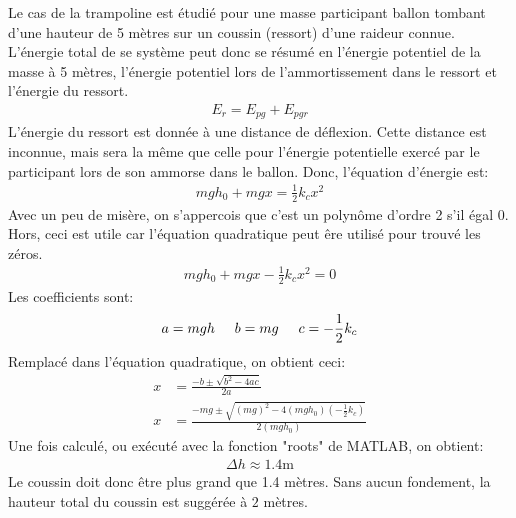 Le cas de la trampoline est étudié pour une masse participant ballon tombant
d'une hauteur de 5 mètres sur un coussin (ressort) d'une raideur connue.
L'énergie total de se système peut donc se résumé en l'énergie potentiel de la
masse à 5 mètres, l'énergie potentiel lors de l'ammortissement dans le ressort
et l'énergie du ressort.
\begin{align}
E_r=E_{pg}+E_{pgr}
\end{align}
L'énergie du ressort est donnée à une distance de déflexion. Cette distance est
inconnue, mais sera la même que celle pour l'énergie potentielle exercé par le
participant lors de son ammorse dans le ballon. Donc, l'équation d'énergie est:
\begin{align}
mgh_0+mgx=\frac{1}{2}k_cx^2
\end{align}
Avec un peu de misère, on s'appercois que c'est un polynôme d'ordre 2 s'il égal
0. Hors, ceci est utile car l'équation quadratique peut êre utilisé pour trouvé
les zéros.
\begin{align}
mgh_0+mgx-\frac{1}{2}k_cx^2=0
\end{align}
Les coefficients sont:
\begin{equation}
	a = mgh \hspace{.5cm} b = mg \hspace{.5cm} c = -\frac{1}{2}k_c
\end{equation}
Remplacé dans l'équation quadratique, on obtient ceci:
\begin{align}
x&=\frac{-b\pm\sqrt{b^2-4ac}}{2a} \\
x&=\frac{-mg\pm\sqrt{(mg)^2-4(mgh_0)(-\frac{1}{2}k_c)}}{2(mgh_0)}
\end{align}
Une fois calculé, ou exécuté avec la fonction "roots" de MATLAB, on obtient:
\begin{align}
\Delta h\approx1.4\text{m}
\end{align}
Le coussin doit donc être plus grand que 1.4 mètres. Sans aucun fondement, la
hauteur total du coussin est suggérée à $2$ mètres.
